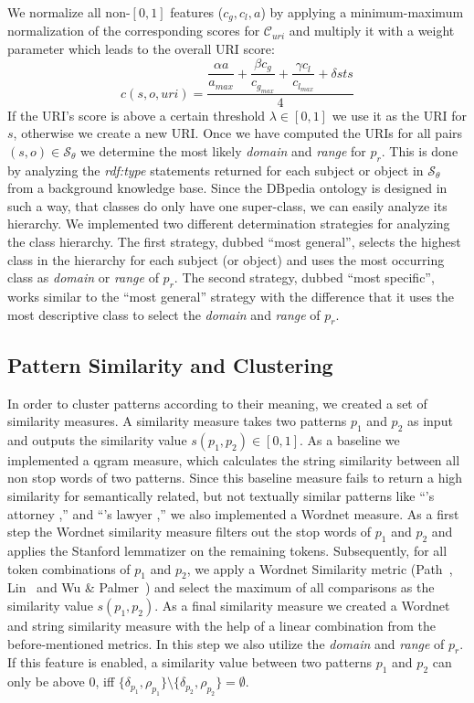 \documentclass[a4paper]{llncs}
\begin{document}
We normalize all non-$[0,1]$ features ($c_g, c_l, a$) by applying a minimum-maximum normalization of the corresponding scores for $\mathcal{C}_{uri}$ and multiply it with a weight parameter which leads to the overall URI score:
\begin{displaymath}
	c(s,o,uri) = \dfrac{\dfrac{\alpha a}{a_{max}} + \dfrac{\beta c_g}{c_{g_{max}}} + \dfrac{\gamma c_l}{c_{l_{max}}} + \delta sts}{4}
\end{displaymath}
If the URI's score is above a certain threshold $\lambda \in [0, 1]$ we use it as the URI for $s$, otherwise we create a new URI.
Once we have computed the URIs for all pairs $(s,o) \in \mathcal{S_\theta}$ we determine the most likely \emph{domain} and \emph{range} for $p_r$.
This is done by analyzing the \emph{rdf:type} statements returned for each subject or object in $\mathcal{S_\theta}$ from a background knowledge base.
Since the DBpedia ontology is designed in such a way, that classes do only have one super-class, we can easily analyze its hierarchy.
We implemented two different determination strategies for analyzing the class hierarchy.
The first strategy, dubbed ``most general'', selects the highest class in the hierarchy for each subject (or object) and uses the most occurring class as \emph{domain} or \emph{range} of $p_r$.
The second strategy, dubbed ``most specific'', works similar to the ``most general'' strategy with the difference that it uses the most descriptive class to select the \emph{domain} and \emph{range} of $p_r$.

\subsection{Pattern Similarity and Clustering}
\label{subsec:pattern_clustering}
In order to cluster patterns according to their meaning, we created a set of similarity measures.
A similarity measure takes two patterns $p_1$ and $p_2$ as input and outputs the similarity value $s(p_1,p_2) \in [0,1]$.
As a baseline we implemented a qgram measure, which calculates the string similarity between all non stop words of two patterns.
Since this baseline measure fails to return a high similarity for semantically related, but not textually similar patterns like ``'s attorney ,'' and ``'s lawyer ,'' we also implemented a Wordnet measure.
As a first step the Wordnet similarity measure filters out the stop words of $p_1$ and $p_2$ and applies the Stanford lemmatizer on the remaining tokens.
Subsequently, for all token combinations of $p_1$ and $p_2$, we apply a Wordnet Similarity metric (Path~\cite{conf/aaai/PedersenPM04}, Lin~\cite{similarity-lin} and Wu \& Palmer~\cite{conf/acl/WuP94}) and select the maximum of all comparisons as the similarity value $s(p_1,p_2)$.
As a final similarity measure we created a Wordnet and string similarity measure with the help of a linear combination from the before-mentioned metrics. 
In this step we also utilize the \emph{domain} and \emph{range} of $p_r$.
If this feature is enabled, a similarity value between two patterns $p_1$ and $p_2$ can only be above 0, iff $\{\delta_{p_1},\rho_{p_1}\} \setminus \{\delta_{p_2},\rho_{p_2}\} = \emptyset$.
\end{document}
